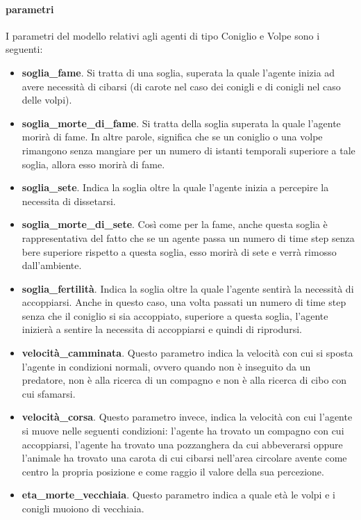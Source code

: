 \documentclass[11pt]{article}
\begin{document}
\paragraph{parametri}
I parametri del modello relativi agli agenti di tipo Coniglio e Volpe sono i seguenti: 
\begin{itemize}
    \item \textbf{soglia\_fame}. Si tratta di una soglia, superata la quale l'agente inizia ad avere necessità di cibarsi (di carote nel caso dei conigli e di conigli nel caso delle volpi).
    \item \textbf{soglia\_morte\_di\_fame}. Si tratta della soglia superata la quale l'agente morirà di fame. In altre parole, significa che se un coniglio o una volpe rimangono senza mangiare per un numero di istanti temporali superiore a tale soglia, allora esso morirà di fame.
    \item \textbf{soglia\_sete}. Indica la soglia oltre la quale l'agente inizia a percepire la necessita di dissetarsi. 
    \item \textbf{soglia\_morte\_di\_sete}. Così come per la fame, anche questa soglia è rappresentativa del fatto che se un agente passa un numero di time step senza bere superiore rispetto a questa soglia,  esso morirà di sete e verrà rimosso dall'ambiente. 
    \item \textbf{soglia\_fertilità}. Indica la soglia oltre la quale l'agente sentirà la necessità di accoppiarsi. Anche in questo caso, una volta passati un numero di time step senza che il coniglio si sia accoppiato, superiore a questa soglia, l'agente inizierà a sentire la necessita di accoppiarsi e quindi di riprodursi.
    \item \textbf{velocità\_camminata}. Questo parametro indica la velocità con cui si sposta l'agente in condizioni normali, ovvero quando non è inseguito da un predatore, non è alla ricerca di un compagno e non è alla ricerca di cibo con cui sfamarsi.  
    \item \textbf{velocità\_corsa}. Questo parametro invece, indica la velocità con cui l'agente si muove nelle seguenti condizioni: l'agente ha trovato un compagno con cui accoppiarsi, l'agente ha trovato una pozzanghera da cui abbeverarsi oppure l'animale ha trovato una carota di cui cibarsi nell'area circolare avente come centro la propria posizione e come raggio il valore della sua percezione.
    \item \textbf{eta\_morte\_vecchiaia}. Questo parametro indica a quale età le volpi e i conigli muoiono di vecchiaia.
\end{itemize}
\end{document}
